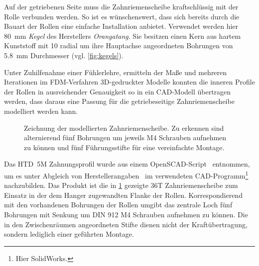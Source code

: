 		Auf der getriebenen Seite muss die Zahnriemenscheibe kraftschlüssig mit der Rolle verbunden werden.
		So ist es wünschenswert, dass sich bereits durch die Bauart der Rollen eine einfache Installation anbietet.
		Verwendet werden hier \qty{80}{\milli\metre} \textit{Kegel} des Herstellers \textit{Orangatang}.
		Sie besitzen einen Kern aus hartem Kunststoff mit 10 radial um ihre Hauptachse angeordneten Bohrungen von \qty{5,8}{\milli\metre} Durchmesser (vgl. \cref{fig:kegels}).
		
		Unter Zuhilfenahme einer Fühlerlehre, ermitteln der Maße und mehreren Iterationen im FDM-Verfahren 3D-gedruckter Modelle konnten die inneren Profile der Rollen in ausreichender Genauigkeit so in ein CAD-Modell übertragen werden, dass daraus eine Passung für die getriebeseitige Zahnriemenscheibe modelliert werden kann.
		\begin{figure}[h]
			\centering
			
			\caption[Zeichnung der modellierten Zahnriemenscheibe]{Zeichnung der modellierten Zahnriemenscheibe. Zu erkennen sind alternierend fünf Bohrungen um jeweils M4 Schrauben aufnehmen zu können und fünf Führungsstifte für eine vereinfachte Montage.}%
			\label{fig:htd 5m driven}
		\end{figure}

		Das HTD~5M Zahnungsprofil wurde aus einem OpenSCAD-Script~\cite{thingiverse.tooth.profiles.2012} entnommen, um es unter Abgleich von Herstellerangaben~\cite{gates.catalogue.2021,GatesCorporation.drive.design.manual.2014} im verwendeten CAD-Programm\footnote{\hspace{1mm} Hier SolidWorks.} nachzubilden.
		Das Produkt ist die in \cref{fig:htd 5m driven} gezeigte 36T Zahnriemenscheibe zum Einsatz in der dem Hanger zugewandten Flanke der Rollen.
		Korrespondierend mit den vorhandenen Bohrungen der Rollen umgibt das zentrale Loch fünf Bohrungen mit Senkung um DIN 912 M4 Schrauben aufnehmen zu können.
		Die in den Zwischenräumen angeordneten Stifte dienen nicht der Kraftübertragung, sondern lediglich einer geführten Montage.
		

